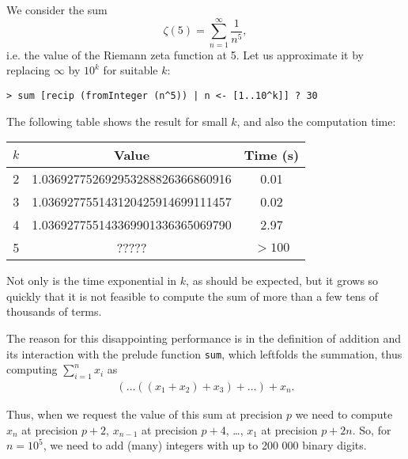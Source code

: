 \documentclass[9pt, a4, twocolumn]{article}
\begin{document}
We consider the sum
$$
\zeta(5) = \sum_{n=1}^{\infty} \frac{1}{n^5},
$$
i.e. the value of the Riemann zeta function at 5.
Let us approximate
it by replacing $\infty$ by $10^k$ for suitable $k$:
\begin{verbatim}
> sum [recip (fromInteger (n^5)) | n <- [1..10^k]] ? 30
\end{verbatim}
The following
table shows the result for small $k$, and also the computation time:
   \begin{center}
     \begin{tabular}{|c|c|c|} \hline
       $k$ & Value & Time (s)\\ \hline
       2 & 1.036927752692953288826366860916 & 0.01 \\
       3 & 1.036927755143120425914699111457 & 0.02 \\
       4 & 1.036927755143369901336365069790 & 2.97 \\
       5 & ????? & $> 100$ \\ \hline
     \end{tabular}
   \end{center}
Not only is the time exponential in $k$, as should be expected, but it
grows so quickly that it is not feasible to compute the sum of more than a few tens
of thousands of terms. 

The reason for this disappointing performance is in the definition of 
addition and its interaction with 
the prelude function \texttt{sum}, which leftfolds the summation, thus computing
$\sum_{i=1}^n x_i$ as
\begin{align*}
  (\ldots((x_1+x_2)+x_3)+\ldots) +x_n.
\end{align*}

Thus, when we request the value of this sum at precision $p$  we need
to compute $x_n$ at precision $p+2$, $x_{n-1}$ at precision $p+4$, \ldots, 
$x_1$ at precision $p+2n$. So, for $n=10^5$, we need to add (many) integers with
up to 200 000 binary digits.  
\end{document}
